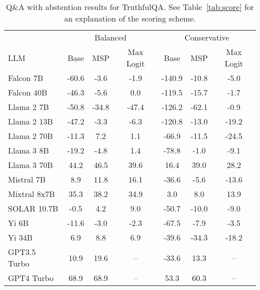 \begin{table*}[h]
\centering
\caption{Q\&A with abstention results for TruthfulQA. See Table~\ref{tab:score} for an explanation of the scoring scheme.}
\label{tab:truthfulqa_score}
\begin{tabular}{lcccccc}
\toprule
& \multicolumn{3}{c}{Balanced} & \multicolumn{3}{c}{Conservative} \\ 
LLM & Base & MSP & Max Logit & Base & MSP & Max Logit \\ 
\cmidrule(lr){1-1}\cmidrule(lr){2-4}\cmidrule(lr){5-7} 
Falcon 7B & -60.6 & -3.6 & -1.9 & -140.9 & -10.8 & -5.0\\
Falcon 40B & -46.3 & -5.6 & 0.0 & -119.5 & -15.7 & -1.7\\
Llama 2 7B & -50.8 & -34.8 & -47.4 & -126.2 & -62.1 & -0.9\\
Llama 2 13B & -47.2 & -3.3 & -6.3 & -120.8 & -13.0 & -19.2\\
Llama 2 70B & -11.3 & 7.2 & 1.1 & -66.9 & -11.5 & -24.5\\
Llama 3 8B & -19.2 & -4.8 & 1.4 & -78.8 & -1.0 & -9.1\\
Llama 3 70B & 44.2 & 46.5 & 39.6 & 16.4 & 39.0 & 28.2\\
Mistral 7B & 8.9 & 11.8 & 16.1 & -36.6 & -5.6 & -13.6\\
Mixtral 8x7B & 35.3 & 38.2 & 34.9 & 3.0 & 8.0 & 13.9\\
SOLAR 10.7B & -0.5 & 4.2 & 9.0 & -50.7 & -10.0 & -9.0\\
Yi 6B & -11.6 & -3.0 & -2.3 & -67.5 & -7.9 & -3.5\\
Yi 34B & 6.9 & 8.8 & 6.9 & -39.6 & -34.3 & -18.2\\
GPT3.5 Turbo & 10.9 & 19.6 & -- & -33.6 & 13.3 & --\\
GPT4 Turbo & 68.9 & 68.9 & -- & 53.3 & 60.3 & --\\
\bottomrule
\end{tabular}
\end{table*}
